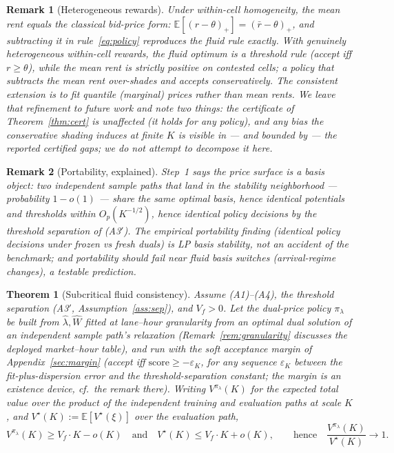 \documentclass[11pt]{article}
\newtheorem{theorem}{Theorem}
\newtheorem{remark}{Remark}
\newcommand{\Vstar}{V^{\star}}
\newcommand{\pol}{\pi_{\lambda}}
\begin{document}
\begin{remark}[Heterogeneous rewards]
\label{rem:heterogeneous}
Under within-cell homogeneity, the mean rent equals the classical
bid-price form: $\mathbb{E}[(r - \theta)_+] = (\bar{r} - \theta)_+$,
and subtracting it in rule~\eqref{eq:policy} reproduces the fluid rule
exactly. With genuinely heterogeneous within-cell rewards, the fluid
optimum is a \emph{threshold} rule (accept iff $r \geq \theta$),
while the mean rent is strictly positive on contested cells; a policy
that subtracts the mean rent over-shades and accepts conservatively.
The consistent extension is to fit quantile (marginal) prices rather
than mean rents. We leave that refinement to future work and note two
things: the certificate of Theorem~\ref{thm:cert} is unaffected
(it holds for any policy), and any bias the conservative shading
induces at finite $K$ is visible in --- and bounded by --- the reported
certified gaps; we do not attempt to decompose it here.
\end{remark}

\begin{remark}[Portability, explained]
\label{rem:portability}
Step~1 says the price surface is a \emph{basis object}: two independent
sample paths that land in the stability neighborhood --- probability
$1 - o(1)$ --- share the same optimal basis, hence identical potentials
and thresholds within $O_p(K^{-1/2})$, hence identical policy decisions
by the threshold separation of (A3$'$). The empirical
portability finding (identical policy decisions under frozen vs fresh
duals) is LP basis stability, not an accident of the benchmark; and
portability should fail near fluid basis switches (arrival-regime
changes), a testable prediction.
\end{remark}

\begin{theorem}[Subcritical fluid consistency]
\label{thm:fluid}
Assume (A1)--(A4), the threshold separation (A3$'$,
Assumption~\ref{ass:sep}), and $V_f > 0$. Let the dual-price policy
$\pol$ be built from $\hat{\lambda}, \widehat{W}$ fitted \emph{at
lane--hour granularity} from an optimal dual solution of an
independent sample path's relaxation
(Remark~\ref{rem:granularity} discusses the deployed market--hour
table), and run with the soft acceptance margin of
Appendix~\ref{sec:margin} (accept iff
$\mathrm{score} \geq -\varepsilon_K$, for any sequence
$\varepsilon_K$ between the fit-plus-dispersion error and the
threshold-separation constant; the margin is an existence device, cf.\
the remark there). Writing $V^{\pol}(K)$ for the expected total value
over the product of the independent training and evaluation paths at
scale $K$, and $\Vstar(K) := \mathbb{E}[\Vstar(\xi)]$ over the
evaluation path,
\begin{equation}
  V^{\pol}(K) \geq V_f \cdot K - o(K)
  \quad\text{and}\quad
  \Vstar(K) \leq V_f \cdot K + o(K),
  \qquad\text{hence}\quad
  \frac{V^{\pol}(K)}{\Vstar(K)} \to 1.
\end{equation}
\end{theorem}
\end{document}
